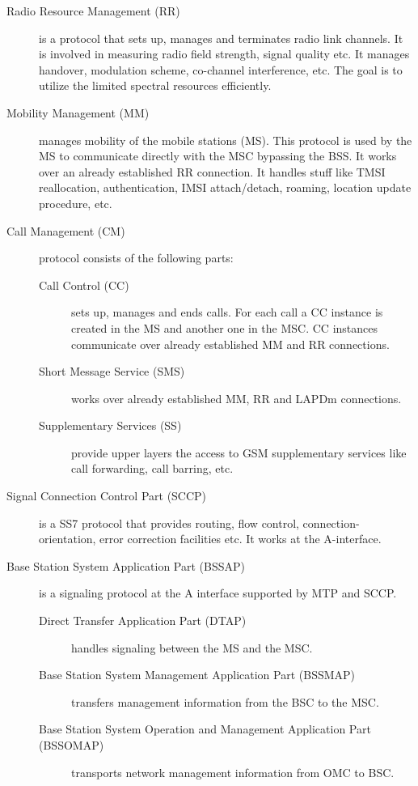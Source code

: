 \begin{description}
 \item [Radio Resource Management (RR)] is a protocol that sets up, manages and terminates
 radio link channels. It is involved in measuring radio field strength, signal quality etc.
 It manages handover, modulation scheme, co-channel interference, etc. The goal is to 
 utilize the limited spectral resources efficiently.
 
 \item [Mobility Management (MM)] manages mobility of the mobile stations (MS). This
 protocol is used by the MS to communicate directly with the MSC bypassing the BSS. It works over an already established
 RR connection. It handles stuff like TMSI reallocation, authentication, IMSI attach/detach, roaming, location update procedure, etc.
 
 \item [Call Management (CM)] protocol consists of the following parts:
 \begin{description}
  \item [Call Control (CC)] sets up, manages and ends calls. For each call a CC instance is created in the MS and another one in the MSC. CC instances 
  communicate over already established MM and RR connections.
  \item [Short Message Service (SMS)] works over already established MM, RR and LAPDm connections.
  \item [Supplementary Services (SS)] provide upper layers the access to GSM supplementary services like call forwarding, call barring, etc. 
 \end{description}

 \item [Signal Connection Control Part (SCCP)] is a SS7 protocol that provides routing, flow control, connection-orientation, error correction facilities etc. It
 works at the A-interface.
 \item [Base Station System Application Part (BSSAP)] is a signaling protocol at the A interface supported by MTP and SCCP.
 \begin{description}
  \item [Direct Transfer Application Part (DTAP)] handles signaling between the MS and the MSC.
  \item [Base Station System Management Application Part (BSSMAP)] transfers management information from the BSC to the MSC.
  \item [Base Station System Operation and Management Application Part (BSSOMAP)] transports network management information from
  OMC to BSC.
 \end{description}


\end{description}
